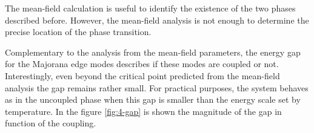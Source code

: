 The mean-field calculation is useful to identify the existence of the two phases described before. %
However, the mean-field analysis is not enough to determine the precise location of the phase transition. 


Complementary to the analysis from the mean-field parameters, the energy gap for the Majorana edge modes describes if these modes are coupled or not. Interestingly, even beyond the critical point predicted from the mean-field analysis the gap remains rather small. For practical purposes, the system behaves as in the uncoupled phase when this gap is smaller than the energy scale set by temperature. In the figure \ref{fig:4-gap} is shown the magnitude of the gap in function of the coupling.

